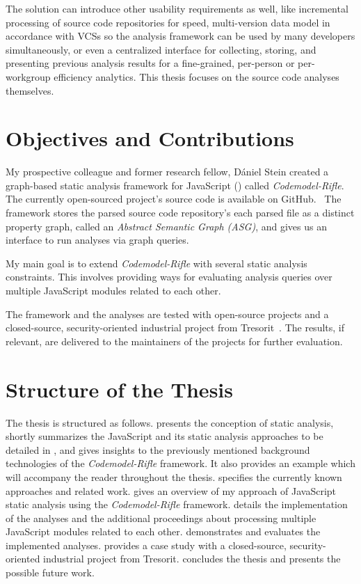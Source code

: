 The solution can introduce other usability requirements as well, like incremental processing of source code repositories for speed, multi-version data model in accordance with VCSs so the analysis framework can be used by many developers simultaneously, or even a centralized interface for collecting, storing, and presenting previous analysis results for a fine-grained, per-person or per-workgroup efficiency analytics. This thesis focuses on the source code analyses themselves.


\section{Objectives and Contributions}

My prospective colleague and former research fellow, Dániel Stein created a graph-based static analysis framework for JavaScript (\es) called \emph{Codemodel-Rifle}.~\cite{stein-daniel-msc} The currently open-sourced project's source code is available on GitHub.~\cite{codemodel-rifle-github} The framework stores the parsed source code repository's each parsed file as a distinct property graph, called an \emph{Abstract Semantic Graph (ASG)}, and gives us an interface to run analyses via graph queries.

My main goal is to extend \emph{Codemodel-Rifle} with several static analysis constraints. This involves providing ways for evaluating analysis queries over multiple JavaScript modules related to each other.

The framework and the analyses are tested with open-source projects and a closed-source, security-oriented industrial project from Tresorit~\cite{tresorit}. The results, if relevant, are delivered to the maintainers of the projects for further evaluation.


\section{Structure of the Thesis}

The thesis is structured as follows. \emph{} presents the conception of static analysis, shortly summarizes the JavaScript and its static analysis approaches to be detailed in , and gives insights to the previously mentioned background technologies of the \emph{Codemodel-Rifle} framework. It also provides an example which will accompany the reader throughout the thesis. \emph{} specifies the currently known approaches and related work. \emph{} gives an overview of my approach of JavaScript static analysis using the \emph{Codemodel-Rifle} framework. \emph{} details the implementation of the analyses and the additional proceedings about processing multiple JavaScript modules related to each other. \emph{} demonstrates and evaluates the implemented analyses. \emph{} provides a case study with a closed-source, security-oriented industrial project from Tresorit. \emph{} concludes the thesis and presents the possible future work.

